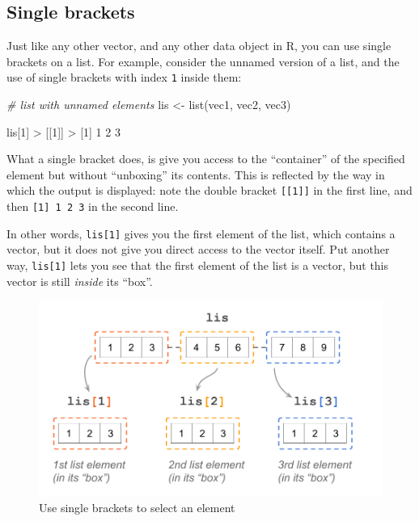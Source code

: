 \documentclass[
]{book}
\newenvironment{Shaded}{\begin{snugshade}}{\end{snugshade}}
\newcommand{\CommentTok}[1]{\textcolor[rgb]{0.56,0.35,0.01}{\textit{#1}}}
\newcommand{\DecValTok}[1]{\textcolor[rgb]{0.00,0.00,0.81}{#1}}
\newcommand{\FunctionTok}[1]{\textcolor[rgb]{0.00,0.00,0.00}{#1}}
\newcommand{\NormalTok}[1]{#1}
\newcommand{\OtherTok}[1]{\textcolor[rgb]{0.56,0.35,0.01}{#1}}
\newcommand{\SpecialCharTok}[1]{\textcolor[rgb]{0.00,0.00,0.00}{#1}}
\begin{document}
\hypertarget{single-brackets}{%
\subsection{Single brackets}\label{single-brackets}}

Just like any other vector, and any other data object in R, you can use single
brackets on a list. For example, consider the unnamed version of a list, and
the use of single brackets with index \texttt{1} inside them:

\begin{Shaded}
\begin{Highlighting}[]
\CommentTok{\# list with unnamed elements}
\NormalTok{lis }\OtherTok{\textless{}{-}} \FunctionTok{list}\NormalTok{(vec1, vec2, vec3)}

\NormalTok{lis[}\DecValTok{1}\NormalTok{]}
\SpecialCharTok{\textgreater{}}\NormalTok{ [[}\DecValTok{1}\NormalTok{]]}
\SpecialCharTok{\textgreater{}}\NormalTok{ [}\DecValTok{1}\NormalTok{] }\DecValTok{1} \DecValTok{2} \DecValTok{3}
\end{Highlighting}
\end{Shaded}

What a single bracket does, is give you access to the ``container'' of the
specified element but without ``unboxing'' its contents. This is reflected by
the way in which the output is displayed: note the double bracket \texttt{{[}{[}1{]}{]}} in
the first line, and then \texttt{{[}1{]}\ 1\ 2\ 3} in the second line.

In other words, \texttt{lis{[}1{]}} gives you the first element of the list, which
contains a vector, but it does not give you direct access to the vector itself.
Put another way, \texttt{lis{[}1{]}} lets you see that the first element of the list is
a vector, but this vector is still \emph{inside} its ``box''.

\begin{figure}

{\centering \includegraphics[width=0.75\linewidth]{images/objects/obj-list-brackets2} 

}

\caption{Use single brackets to select an element}\label{fig:unnamed-chunk-149}
\end{figure}
\end{document}
